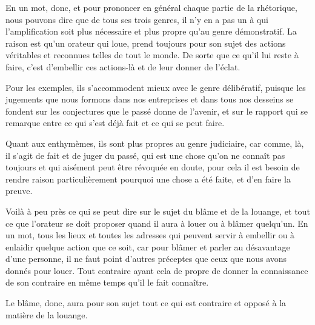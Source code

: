 En un mot, donc, et pour prononcer en général chaque partie de la rhétorique, nous pouvons dire que de tous ses
trois genres, il n'y en a pas un à qui l'amplification soit plus nécessaire et plus propre qu'au genre démonstratif.
La raison est qu'un orateur qui loue, prend toujours pour son sujet des actions véritables et reconnues telles de
tout le monde. De sorte que ce qu'il lui reste à faire, c'est d'embellir ces actions-là et de leur donner de l'éclat.

Pour les exemples, ils s'accommodent mieux avec le genre délibératif, puisque les jugements que nous formons dans
nos entreprises et dans tous nos desseins se fondent sur les conjectures que le passé donne de l'avenir, et sur
le rapport qui se remarque entre ce qui s'est déjà fait et ce qui se peut faire. 

Quant aux enthymèmes, ils sont plus propres au genre judiciaire, car comme, là, il s'agit de fait et de juger du
passé, qui est une chose qu'on ne connaît pas toujours et qui aisément peut être révoquée en doute, pour cela il
est besoin de rendre raison particulièrement pourquoi une chose a été faite, et d'en faire la preuve.

Voilà à peu près ce qui se peut dire sur le sujet du blâme et de la louange, et tout ce que l'orateur se doit
proposer quand il aura à louer ou à blâmer quelqu'un. En un mot, tous les lieux et toutes les adresses qui peuvent
servir à embellir ou à enlaidir quelque action que ce soit, car pour blâmer et parler au désavantage d'une personne,
il ne faut point d'autres préceptes que ceux que nous avons donnés pour louer. Tout contraire ayant cela de propre
de donner la connaissance de son contraire en même temps qu'il le fait connaître.

\bigbreak

Le blâme, donc, aura pour son sujet tout ce qui est contraire et opposé à la matière de la louange.